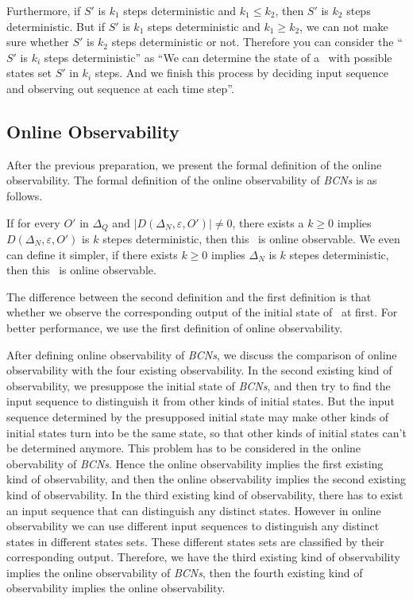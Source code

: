Furthermore, if $S'$ is $k_1$ steps deterministic and $k_1\leq k_2$, then $S'$ is $k_2$ steps deterministic. But if $S'$ is $k_1$ steps deterministic and $k_1\geq k_2$, we can not make sure whether $S'$ is $k_2$ steps deterministic or not. Therefore you can consider the ``$S'$ is $k_i$ steps deterministic'' as ``We can determine the state of a \BCN\ with possible states set $S'$ in $k_i$ steps. And we finish this process by deciding input sequence and observing out sequence at each time step''. 
\subsection{Online Observability}
After the previous preparation, we present the formal definition of the online observability. The formal definition of the online observability of {\em BCNs} is as follows.
\begin{definition}
If for every  $O'$ in $\Delta_Q$ and $|D\left(\Delta_N,\varepsilon, O'\right)|\neq 0$, there exists a $ k \ge 0$ implies $D\left(\Delta_N,\varepsilon,O'\right)$ is $k$ stepes deterministic, then this \BCN\ is online observable. We even can define it simpler, if there exists $k \ge 0$ implies $\Delta_N$ is $k$ stepes deterministic, then this \BCN\ is online observable. 
\end{definition}

The difference between the second definition and the first definition is that whether we observe the corresponding output of the initial state of \BCN\ at first. For better performance, we use the first definition of online observability.

After defining online observability of {\em BCNs}, we discuss the comparison of online observability with the four existing observability. In the second existing kind of observability, we presuppose the initial state of {\em BCNs}, and then try to find the input sequence to distinguish it from other kinds of initial states. But the input sequence determined by the presupposed initial state may make other kinds of initial states turn into be the same state, so that other kinds of initial states can't be determined anymore. This problem has to be considered in the online obervability of {\em BCNs}. Hence the online observability implies the first existing kind of observability, and then the online observability implies the second existing kind of observability. In the third existing kind of observability, there has to exist an input sequence that can distinguish any distinct states. However in online observability we can use different input sequences to distinguish any distinct states in different states sets. These different states sets are classified by their corresponding output. Therefore, we have the third existing kind of observability implies the online observability of {\em BCNs}, then the fourth existing kind of observability implies the online observability.

